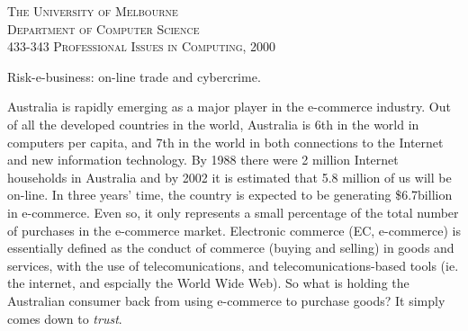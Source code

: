 \documentclass[11pt,a4paper,twoside,notitlepage]{article}
\begin{document}
\begin{center}

\textsc{\large The University of Melbourne\\
	\large Department of Computer Science\\
	\large 433-343 Professional Issues in Computing, 2000\\}

\vspace{5cm}

{\huge Risk-e-business: on-line trade and cybercrime.}

\vspace{.5cm}

{\Large }

\date{\today}

\vspace{4cm}

\end{center}

\begin{abstract}

The Internet and E-commerce are revolutionising the way companies and consumers interact,
contradicting the precedents set by traditional business.  With enormous increases
in sales figures in the last three years, e-commerce is fast becoming one of the most
viable means to promote and conduct business.  However, a recent spate of security breaches
has highlighted the risks consumers face when shopping on-line.  Events like these
have raised a plethora of issues surrounding security.  New strategies and
technologies are being introduced to combat the problems of cybercrime, and minimise its
effect on the e-commerce industry.



\end{abstract}

\newpage

Australia is rapidly emerging as a major player in the e-commerce industry.
Out of all the developed countries in the world, Australia is 6th in the world in
computers per capita, and 7th in the world in both connections to the Internet
and new information technology\cite{WCY:wcy99}.  By 1988 there were 2 million Internet households in Australia and by 2002 it is estimated that
5.8 million of us will be on-line.  In three years' time, the country is expected to be generating
\$6.7billion in e-commerce\cite{Horadam:Age99}.
Even so, it only represents a small percentage of the total number of purchases in 
the e-commerce market.
Electronic commerce (EC, e-commerce) is essentially defined as the conduct of commerce
(buying and selling) in goods and services, with the use of telecomunications, and 
telecomunications-based tools (ie. the internet, and espcially the World Wide Web)\cite{Clarke:url99}.
So what is holding the Australian consumer back from using e-commerce to purchase goods?
It simply comes down to \textit{trust}.
\end{document}

